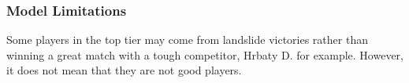\subsubsection{Model Limitations}
Some players in the top tier may come from landslide victories rather than winning a great match with a tough competitor, Hrbaty D. for example.  However, it does not mean that they are not good players. %